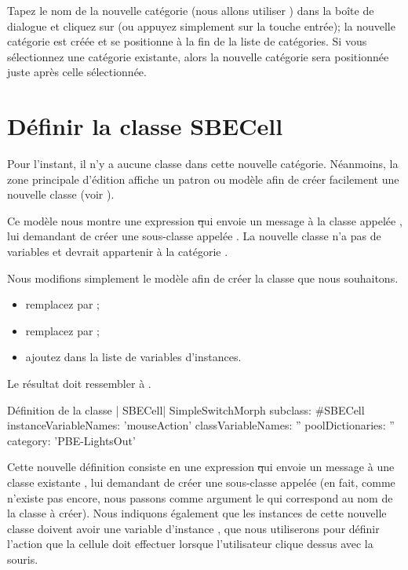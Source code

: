 \documentclass[a4paper,10pt,twoside]{book}
\begin{document}
Tapez le nom de la nouvelle catégorie (nous allons utiliser
) dans la boîte de dialogue et cliquez sur
 (ou appuyez simplement sur la touche entrée); la nouvelle catégorie est créée et se positionne à la fin de la liste de catégories.
Si vous sélectionnez une catégorie existante, alors la nouvelle catégorie sera positionnée juste après celle sélectionnée.

\section{Définir la classe SBECell}

Pour l'instant, il n'y a aucune classe dans cette nouvelle
catégorie. Néanmoins, la zone principale d'édition affiche un
patron ou modèle afin de créer facilement une nouvelle classe (voir ).

Ce modèle nous montre une expression \st qui envoie un message à la classe appelée , lui demandant de créer une sous-classe appelée .  La nouvelle classe n'a pas de variables et devrait appartenir à la catégorie .

Nous modifions simplement le modèle afin de créer la classe que nous souhaitons.

\begin{itemize}
  \item remplacez  par ;
  \item remplacez  par ;
  \item ajoutez  dans la liste de variables d'instances.
\end{itemize}
Le résultat doit ressembler à .

\begin{classdef}[firstClassDef]{Définition de la classe \ct| SBECell|}
SimpleSwitchMorph subclass: #SBECell
   instanceVariableNames: 'mouseAction'
   classVariableNames: ''
   poolDictionaries: ''
   category: 'PBE-LightsOut'
\end{classdef}

Cette nouvelle définition consiste en une expression \st qui envoie un message à une classe existante , lui demandant de créer une sous-classe appelée 
(en fait, comme  n'existe pas encore, nous passons comme argument le   qui correspond au nom de la classe à créer).
Nous indiquons également que les instances de cette nouvelle classe doivent avoir une variable d'instance , que nous utiliserons pour définir l'action que la cellule doit effectuer lorsque l'utilisateur clique dessus avec la souris.
\end{document}
